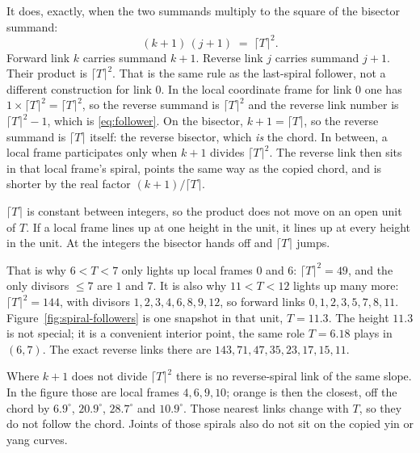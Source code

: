 \documentclass[11pt]{article}
\theoremstyle{definition}
\begin{document}
It does, exactly, when the two summands multiply to the square of the
bisector summand:
\begin{equation}\label{eq:follower-product}
(k+1)\,(j+1)
\;=\;
\lceil T\rceil^{2}.
\end{equation}
Forward link $k$ carries summand $k+1$. Reverse link $j$ carries summand
$j+1$. Their product is $\lceil T\rceil^{2}$. That is the same rule as the
last-spiral follower, not a different construction for link $0$. In the local coordinate frame for link
$0$ one has $1\times\lceil T\rceil^{2}=\lceil T\rceil^{2}$, so the reverse
summand is $\lceil T\rceil^{2}$ and the reverse link number is
$\lceil T\rceil^{2}-1$, which is \eqref{eq:follower}. On the bisector,
$k+1=\lceil T\rceil$, so the reverse summand is $\lceil T\rceil$ itself:
the reverse bisector, which \emph{is} the chord. In between, a local frame
participates only when $k+1$ divides $\lceil T\rceil^{2}$. The reverse
link then sits in that local frame's spiral, points the same way as the copied
chord, and is shorter by the real factor $(k+1)/\lceil T\rceil$.

$\lceil T\rceil$ is constant between integers, so the product does not
move on an open unit of $T$. If a local frame lines up at one height in the
unit, it lines up at every height in the unit. At the integers the
bisector hands off and $\lceil T\rceil$ jumps.

That is why $6<T<7$ only lights up local frames $0$ and $6$:
$\lceil T\rceil^{2}=49$, and the only divisors $\le 7$ are $1$ and $7$.
It is also why $11<T<12$ lights up many more:
$\lceil T\rceil^{2}=144$, with divisors $1,2,3,4,6,8,9,12$, so forward
links $0,1,2,3,5,7,8,11$. Figure~\ref{fig:spiral-followers} is one
snapshot in that unit, $T=11.3$. The height $11.3$ is not special; it is
a convenient interior point, the same role $T=6.18$ plays in $(6,7)$.
The exact reverse links there are $143,71,47,35,23,17,15,11$.

Where $k+1$ does not divide $\lceil T\rceil^{2}$ there is no
reverse-spiral link of the same slope. In the figure those are local frames
$4,6,9,10$; orange is then the closest, off the chord by
$6.9^\circ$, $20.9^\circ$, $28.7^\circ$ and $10.9^\circ$. Those nearest
links change with $T$, so they do not follow the chord. Joints of those
spirals also do not sit on the copied yin or yang curves.
\end{document}

